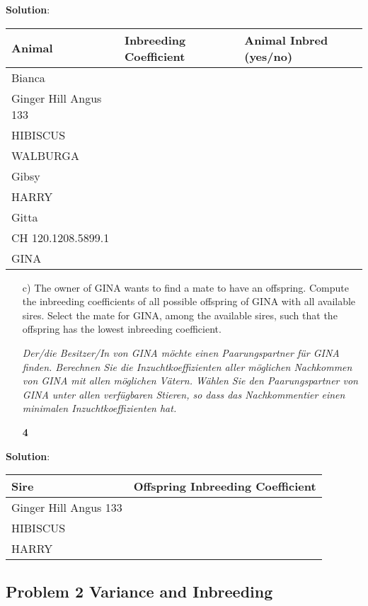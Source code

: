 \documentclass[
]{article}
\newcommand{\points}[1]
{\begin{flushright}\textbf{#1}\end{flushright}}
\newcommand{\solstart}
{\vspace{3ex}\textbf{Solution}:}
\begin{document}
\solstart

\vspace{3ex}

\begin{tabular}{lll}
\toprule
Animal & Inbreeding Coefficient & Animal Inbred (yes/no)\\
\midrule
Bianca &  & \\
Ginger Hill Angus 133 &  & \\
HIBISCUS &  & \\
WALBURGA &  & \\
Gibsy &  & \\
\addlinespace
HARRY &  & \\
Gitta &  & \\
CH 120.1208.5899.1 &  & \\
GINA &  & \\
\bottomrule
\end{tabular}

\clearpage
\pagebreak

\begin{enumerate}
\item[c)] The owner of GINA wants to find a mate to have an offspring. Compute the inbreeding coefficients of all possible offspring of GINA with all available sires. Select the mate for GINA, among the available sires, such that the offspring has the lowest inbreeding coefficient. 

\textit{Der/die Besitzer/In von GINA möchte einen Paarungspartner für GINA finden. Berechnen Sie die Inzuchtkoeffizienten aller möglichen Nachkommen von GINA mit allen möglichen Vätern. Wählen Sie den Paarungspartner von GINA unter allen verfügbaren Stieren, so dass das Nachkommentier einen minimalen Inzuchtkoeffizienten hat.}
\points{4}
\end{enumerate}

\vspace{3ex}
\solstart

\begin{tabular}{ll}
\toprule
Sire & Offspring Inbreeding Coefficient\\
\midrule
Ginger Hill Angus 133 & \\
HIBISCUS & \\
HARRY & \\
\bottomrule
\end{tabular}

\clearpage
\pagebreak

\hypertarget{problem-2-variance-and-inbreeding}{%
\subsection{Problem 2 Variance and
Inbreeding}\label{problem-2-variance-and-inbreeding}}
\end{document}
